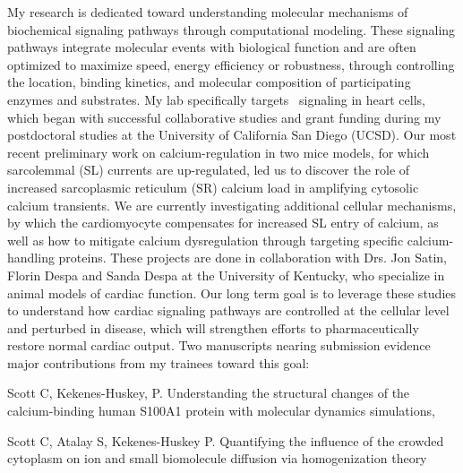 My research is dedicated toward understanding molecular mechanisms of biochemical signaling pathways through computational modeling. 
These signaling pathways integrate molecular events with biological function and are often optimized to maximize speed, energy efficiency or robustness, through controlling the location, binding kinetics, and molecular composition of participating enzymes and substrates. 
My lab specifically targets \catwo\ signaling in heart cells, which began with successful collaborative studies and grant funding during my postdoctoral studies at the University of California San Diego (UCSD).
Our most recent preliminary work on calcium-regulation in two mice models, for which sarcolemmal (SL) currents are up-regulated, led us to discover the role of increased sarcoplasmic reticulum (SR) calcium load in amplifying cytosolic calcium transients.
We are currently investigating additional cellular mechanisms, by which the cardiomyocyte compensates for increased SL entry of calcium, as well as how to mitigate calcium dysregulation through targeting specific calcium-handling proteins.  
These projects are done in collaboration with Drs. Jon Satin, Florin Despa and Sanda Despa at the University of Kentucky, who specialize in animal models of cardiac function.
Our long term goal is to leverage these studies to understand how cardiac  signaling pathways are controlled at the cellular level and perturbed in disease, which will strengthen efforts to pharmaceutically restore normal cardiac output.
Two manuscripts nearing submission evidence major contributions from my trainees toward this goal:
\lbn
\item Scott C, Kekenes-Huskey, P. Understanding the structural changes of the calcium-binding human S100A1 protein with molecular dynamics simulations, 
\item Scott C, Atalay S, Kekenes-Huskey P. Quantifying the influence of the crowded cytoplasm on ion and small biomolecule diffusion via homogenization theory
\len
